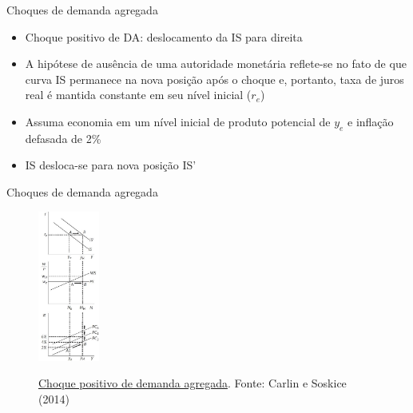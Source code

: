 \documentclass[10pt]{beamer}
\begin{document}
\begin{frame}
    {Choques de demanda agregada}
    \begin{itemize}
        \item Choque positivo de DA: deslocamento da IS para direita\bigskip
        \item A hipótese de ausência de uma autoridade monetária reflete-se no fato de que curva IS permanece na nova posição após o choque e, portanto, taxa de juros real é mantida constante em seu nível inicial ($r_e$)\bigskip
        \item Assuma economia em um nível inicial de produto potencial de $y_e$ e inflação defasada de 2\% \bigskip
        \item IS desloca-se para nova posição IS'
    \end{itemize}
\end{frame}

\begin{frame}
    {Choques de demanda agregada}
    \begin{figure}
        \href{https://bookdown.org/robohay/economicsnotes/Figures/Supply/demandshock.jpg}{\includegraphics[width=0.18\textwidth]{./figures/aula14_fig4.jpg}}
        \caption{\href{https://bookdown.org/robohay/economicsnotes/Figures/Supply/demandshock.jpg}{Choque positivo de demanda agregada}. Fonte: Carlin e Soskice (2014)}
    \end{figure}
\end{frame}
\end{document}

